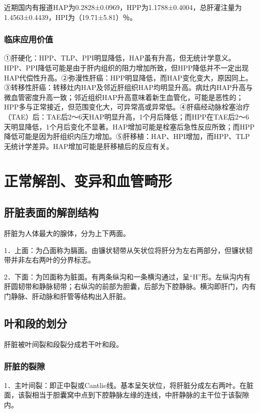 近期国内有报道HAP为0.2828±0.0969，HPP为1.1788±0.4004，总肝灌注量为1.4563±0.4439，HPI为（19.71±5.81）％。

\subsubsection{临床应用价值}

①肝硬化：HPP、TLP、PPI明显降低，HAP虽有升高，但无统计学意义。HPP、PPI降低可能是由于肝内组织的阻力增加所致，但HPP降低并不一定出现HAP代偿性升高。②弥漫性肝癌：HPP明显降低，而HAP变化变大，原因同上。③转移性肝癌：转移灶内HAP及邻近肝组织HAP均明显升高。病灶内HAP升高与微血管密度升高一致；邻近组织HAP升高意味着新生血管化，可能是恶性的；HPP多与正常接近，但范围变化大，可异常高或异常低。④肝癌经动脉栓塞治疗（TAE）后：TAE后2～6天HAP明显升高，1个月后降低；而HPP在TAE后2～6天明显降低，1个月后变化不显著。HAP增加可能是栓塞后急性反应所致；而HPP降低可能是因为肝组织内压力增加。⑤肝移植：HAP、HPI增加，而HPP、TLP无统计学差异。HAP增加可能是肝移植后的反应有关。

\section{正常解剖、变异和血管畸形}

\subsection{肝脏表面的解剖结构}

肝脏为人体最大的腺体，分为上下两面。

1．上面：为凸面称为膈面。由镰状韧带从矢状位将肝分为左右两部分，但镰状韧带并非左右两叶的分界标志。

2．下面：为凹面称为脏面。有两条纵沟和一条横沟通过，呈“H”形。左纵沟内有肝圆韧带和静脉韧带；右纵沟的前部为胆囊，后部为下腔静脉。横沟即肝门，内有门静脉、肝动脉和肝管等结构出入肝脏。

\subsection{叶和段的划分}

肝脏被叶间裂和段裂分成若干叶和段。

\subsubsection{肝脏的裂隙}

1．主叶间裂：即正中裂或Cantlie线。基本呈矢状位，将肝脏分成左右两叶。在脏面，该裂相当于胆囊窝中点到下腔静脉左缘的连线，中肝静脉的主干位于该裂隙内。

